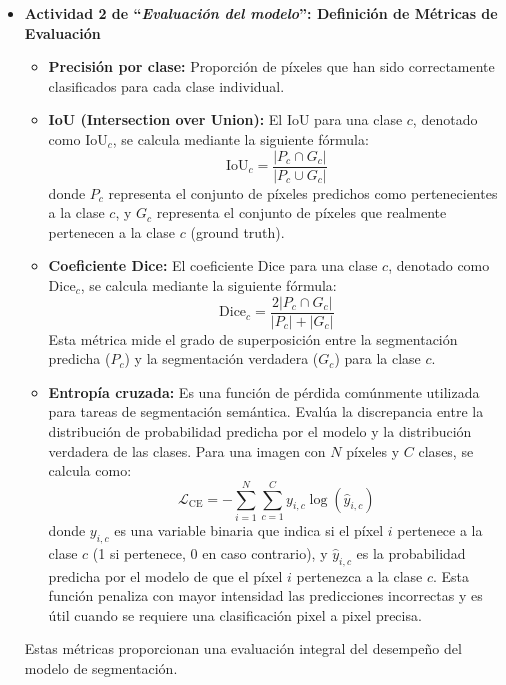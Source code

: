 \begin{enumerate}
\begin{itemize}
  \item\textbf{Actividad 2 de “\textit{Evaluación del modelo}”: Definición de Métricas de Evaluación}
    \begin{itemize}
  \item \textbf{Precisión por clase:} Proporción de píxeles que han sido correctamente clasificados para cada clase individual.

  \item \textbf{IoU (Intersection over Union):} El IoU para una clase $c$, denotado como $\text{IoU}_c$, se calcula mediante la siguiente fórmula:
$$\text{IoU}_c = \frac{|P_c \cap G_c|}{|P_c \cup G_c|}$$
donde $P_c$ representa el conjunto de píxeles predichos como pertenecientes a la clase $c$, y $G_c$ representa el conjunto de píxeles que realmente pertenecen a la clase $c$ (ground truth).

  \item \textbf{Coeficiente Dice:} El coeficiente Dice para una clase $c$, denotado como $\text{Dice}_c$, se calcula mediante la siguiente fórmula:
$$\text{Dice}_c = \frac{2|P_c \cap G_c|}{|P_c| + |G_c|}$$
Esta métrica mide el grado de superposición entre la segmentación predicha ($P_c$) y la segmentación verdadera ($G_c$) para la clase $c$.
 

  \item \textbf{Entropía cruzada:} Es una función de pérdida comúnmente utilizada para tareas de segmentación semántica. Evalúa la discrepancia entre la distribución de probabilidad predicha por el modelo y la distribución verdadera de las clases. Para una imagen con $N$ píxeles y $C$ clases, se calcula como:
$$\mathcal{L}_{\text{CE}} = -\sum_{i=1}^{N} \sum_{c=1}^{C} y_{i,c} \log(\hat{y}_{i,c})$$
donde $y_{i,c}$ es una variable binaria que indica si el píxel $i$ pertenece a la clase $c$ (1 si pertenece, 0 en caso contrario), y $\hat{y}_{i,c}$ es la probabilidad predicha por el modelo de que el píxel $i$ pertenezca a la clase $c$. Esta función penaliza con mayor intensidad las predicciones incorrectas y es útil cuando se requiere una clasificación pixel a pixel precisa.
\end{itemize}

Estas métricas proporcionan una evaluación integral del desempeño del modelo de segmentación.



\end{itemize}
\end{enumerate}
